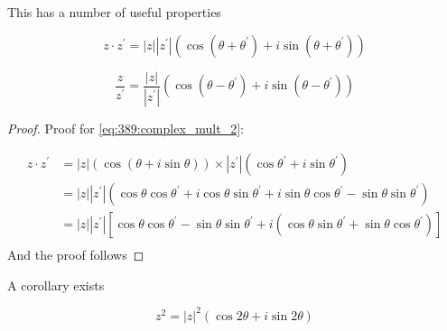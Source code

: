 \documentclass[../notes.tex]{subfiles}
\begin{document}
This has a number of useful properties


\begin{equation}
	z \cdot  z^\prime = |z| |z^\prime| (\cos(\theta + \theta^\prime) + i \sin(\theta + \theta^\prime))
	\label{eq:389:complex_mult_2}
\end{equation}

\begin{equation}
	\frac{z}{z^\prime} = \frac{|z|}{|z^\prime|} (\cos(\theta - \theta^\prime) + i \sin(\theta - \theta^\prime))
	\label{eq:389:complex_div_2}
\end{equation}


\begin{proof}
	Proof for \eqref{eq:389:complex_mult_2}:

	\begin{equation}
		\begin{split}
			z \cdot  z^\prime &= |z|(\cos(\theta + i \sin \theta)) \times |z^\prime| (\cos \theta^\prime + i \sin \theta ^\prime) \\
			 &= |z| |z^\prime| (\cos\theta \cos\theta^\prime + i \cos\theta \sin\theta^\prime + i \sin \theta \cos \theta^\prime - \sin\theta \sin\theta^\prime ) \\ 
			 &= |z| |z^\prime| \left[ \cos\theta \cos \theta^\prime - \sin \theta \sin \theta^\prime   + i (\cos\theta \sin\theta^\prime + \sin\theta \cos\theta^\prime)\right]  \\
		\end{split}
	\end{equation}
	And the proof follows
\end{proof}


\begin{lemma}
	A corollary exists

	\begin{equation}
		z^2 = |z|^2 (\cos2\theta + i \sin 2 \theta)
	\end{equation}
	
\end{lemma}
\end{document}
